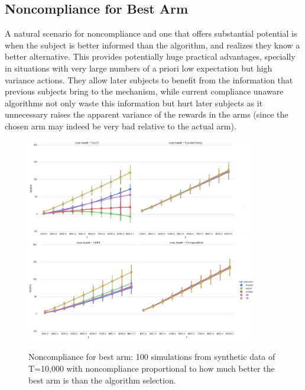 \subsection{Noncompliance for Best Arm}


A natural scenario for noncompliance and one that offers substantial potential is when the subject is better informed than the algorithm, and realizes they know a better alternative. 
This provides potentially huge practical advantages, specially in situations with very large numbers of a priori low expectation but high variance actions. 
They allow later subjects to benefit from the information that previous subjects bring to the mechanism, while current compliance unaware algorithms not only waste this information but hurt later subjects as it unnecessary raises the apparent variance of the rewards in the arms (since the chosen arm may indeed be very bad relative to the actual arm).




\begin{figure}[t]
	\centering	
	\includegraphics[width=0.9\textwidth]{bandit/figs/ex4.png}\hspace{1cm}
	\label{fig:ex4}
	\caption{Noncompliance for best arm: 100 simulations from synthetic data of T=10,000 with noncompliance proportional to how much better the best arm is than the algorithm selection.}
\end{figure}




